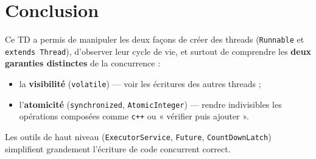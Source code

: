 \documentclass[11pt,a4paper]{article}
\begin{document}
\section*{Conclusion}
Ce TD a permis de manipuler les deux façons de créer des threads (\texttt{Runnable} et
\texttt{extends Thread}), d'observer leur cycle de vie, et surtout de comprendre les
\textbf{deux garanties distinctes} de la concurrence :
\begin{itemize}[nosep]
  \item la \textbf{visibilité} (\texttt{volatile}) — voir les écritures des autres threads ;
  \item l'\textbf{atomicité} (\texttt{synchronized}, \texttt{AtomicInteger}) — rendre
  indivisibles les opérations composées comme \texttt{c++} ou « vérifier puis ajouter ».
\end{itemize}
Les outils de haut niveau (\texttt{ExecutorService}, \texttt{Future},
\texttt{CountDownLatch}) simplifient grandement l'écriture de code concurrent correct.
\end{document}
